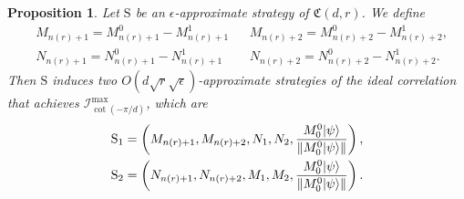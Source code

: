 \documentclass[11pt,letterpaper]{article}
\newcommand{\ket}[1]{|#1\rangle}
\DeclarePairedDelimiter{\norm}{\lVert}{\rVert}
\newcommand{\1}{\mathbb{1}}
\newcommand{\nr}{n(r)}
\newcommand{\fC}{\mathfrak{C}}
\newcommand{\bS}{\mathrm{S}}
\newcommand{\I}{\mathcal{I}}
\newcommand{\ep}{\epsilon}
\newcommand{\se}{\sqrt{\epsilon}}
\newcommand{\sr}{\sqrt{r}}
\newtheorem{proposition}[theorem]{Proposition}
\theoremstyle{definition}
\begin{document}
\begin{proposition}
	\label{prop:s1s2}
	Let $\bS$ be an $\ep$-approximate strategy of $\fC(d,r)$. We define
	\begin{align}
		&M_{\nr+1} = M_{\nr+1}^0 - M_{\nr+1}^1  && 
		M_{\nr+2} = M_{\nr+2}^0 - M_{\nr+2}^1,\\
		&N_{\nr+1} = N_{\nr+1}^0 - N_{\nr+1}^1  && 
		N_{\nr+2} = N_{\nr+2}^0 - N_{\nr+2}^1.
	\end{align}
	Then $\bS$ induces two $O(d \sr \se)$-approximate strategies of the ideal correlation that achieves $\I_{\cot(-\pi/d)}^{\max}$, which are
	\begin{align}
		\bS_1 = \left(M_{\nr+1}, M_{\nr+2}, N_1, N_2, \frac{M_0^0\ket{\psi}}{\norm{M_0^0\ket{\psi}}}\right),\\
		\bS_2 = \left(N_{\nr+1}, N_{\nr+2}, M_1, M_2, \frac{M_0^0\ket{\psi}}{\norm{M_0^0\ket{\psi}}}\right).
	\end{align}
\end{proposition}
\end{document}
